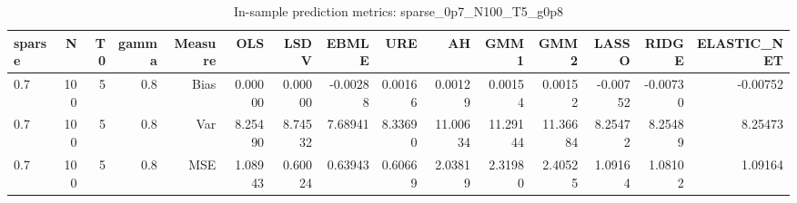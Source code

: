 \begin{table}[!htbp]\centering
\caption{In-sample prediction metrics: sparse_0p7_N100_T5_g0p8}
\label{tab:table2_sparse_0p7_N100_T5_g0p8}
\begin{tabular}{lrrrrrrrrrrrrrr}
\hline
sparse & N & T0 & gamma & Measure & OLS & LSDV & EBMLE & URE & AH & GMM1 & GMM2 & LASSO & RIDGE & ELASTIC_NET \\
\hline
0.7 & 100 & 5 & 0.8 & Bias & 0.00000 & 0.00000 & -0.00288 & 0.00166 & 0.00129 & 0.00154 & 0.00152 & -0.00752 & -0.00730 & -0.00752 \\
0.7 & 100 & 5 & 0.8 & Var & 8.25490 & 8.74532 & 7.68941 & 8.33690 & 11.00634 & 11.29144 & 11.36684 & 8.25472 & 8.25489 & 8.25473 \\
0.7 & 100 & 5 & 0.8 & MSE & 1.08943 & 0.60024 & 0.63943 & 0.60669 & 2.03819 & 2.31980 & 2.40525 & 1.09164 & 1.08102 & 1.09164 \\
\hline
\end{tabular}
\end{table}

